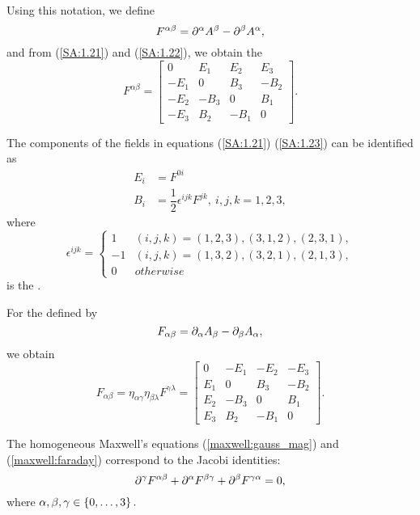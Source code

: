 Using this notation, we define 
\begin{equation}
\label{SA:1.28}
F^{\alpha \beta}=\partial^{\alpha}A^{\beta}-\partial^{\beta}A^{\alpha},
\end{equation}
and from (\ref{SA:1.21}) and (\ref{SA:1.22}), we obtain the 
\begin{equation}
\label{maxwell:contrav_tensor}
F^{\alpha \beta} =
\begin{bmatrix}
0 & E_{1} & E_{2} & E_{3} \\
-E_{1} & 0 & B_{3} & -B_{2} \\
-E_{2} & -B_{3} & 0 & B_{1} \\
-E_{3} & B_{2} & -B_{1} & 0
\end{bmatrix}.
\end{equation}

The components of the fields in equations (\ref{SA:1.21}) (\ref{SA:1.23}) can be identified as
\begin{align}
\label{SA:1.30}
E_{i}&=F^{0 i} \\
B_{i}&=\dfrac{1}{2}\epsilon^{i j k}F^{j k}, \ i,j,k=1,2,3,
\end{align}
where
$$
\epsilon^{i j k}=
\begin{cases}
1 & (i,j,k)= (1,2,3), (3,1,2), (2,3,1), \\
-1 & (i,j,k)=(1,3,2), (3,2,1), (2,1,3), \\
0 & otherwise
\end{cases}
$$
is the .

For the  defined by
\begin{equation}
F_{\alpha \beta}=\partial_{\alpha}A_{\beta}-\partial_{\beta}A_{\alpha},
\end{equation}
we obtain
\begin{equation}
\label{maxwell:cov_tensor}
F_{\alpha \beta} = \eta_{\alpha \gamma} \eta_{\beta \lambda} F^{\gamma \lambda}=
\begin{bmatrix}
0 & -E_{1} & -E_{2} & -E_{3} \\
E_{1} & 0 & B_{3} & -B_{2} \\
E_{2} & -B_{3} & 0 & B_{1} \\
E_{3} & B_{2} & -B_{1} & 0
\end{bmatrix}.
\end{equation}

The homogeneous Maxwell's equations (\ref{maxwell:gauss_mag}) and (\ref{maxwell:faraday}) correspond to the Jacobi identities:
\begin{equation}
\label{SA:1.35}
\partial^{\gamma} F^{\alpha \beta}+ \partial^{\alpha}F^{\beta \gamma} + \partial^{\beta} F^{\gamma \alpha}=0,
\end{equation}
where $\alpha, \beta, \gamma \in \left\{ 0,\dots,3 \right\}.$

